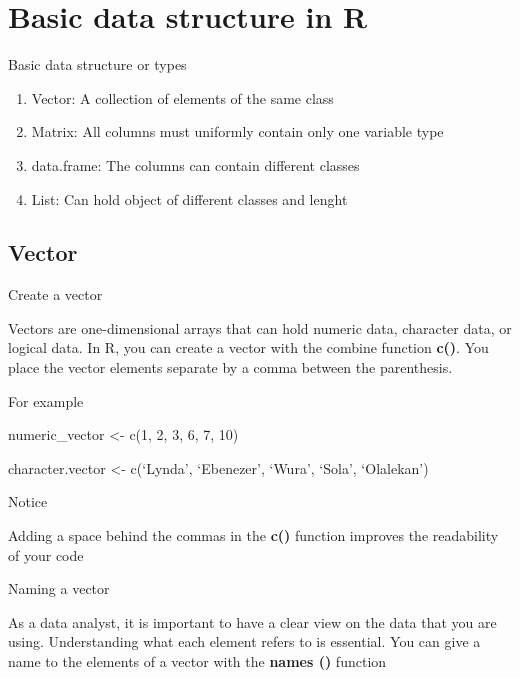 \documentclass[
  ignorenonframetext,
]{beamer}
\providecommand{\tightlist}{%
  \setlength{\itemsep}{0pt}\setlength{\parskip}{0pt}}
\begin{document}
\section{Basic data structure in R}
\begin{frame}{Basic data structure or types}
\protect\hypertarget{basic-data-structure-or-types}{}

\begin{enumerate}
\tightlist
\item
  Vector: A collection of elements of the same class
\item
  Matrix: All columns must uniformly contain only one variable type
\item
  data.frame: The columns can contain different classes
\item
  List: Can hold object of different classes and lenght
\end{enumerate}

\end{frame}
\subsection{Vector}
\begin{frame}{Create a vector}
\protect\hypertarget{create-a-vector}{}

Vectors are one-dimensional arrays that can hold numeric data, character
data, or logical data. In R, you can create a vector with the combine
function \textbf{c()}. You place the vector elements separate by a comma
between the parenthesis.

\begin{block}{For example}

numeric\_vector \textless- c(1, 2, 3, 6, 7, 10)

character.vector \textless- c(`Lynda', `Ebenezer', `Wura',
`Sola', `Olalekan')

\end{block}

\begin{block}{Notice}

Adding a space behind the commas in the \textbf{c()} function improves
the readability of your code

\end{block}

\end{frame}

\begin{frame}{Naming a vector}
\protect\hypertarget{naming-a-vector}{}

As a data analyst, it is important to have a clear view on the data that
you are using. Understanding what each element refers to is essential.
You can give a name to the elements of a vector with the
\textbf{names ()} function

\end{frame}
\end{document}
